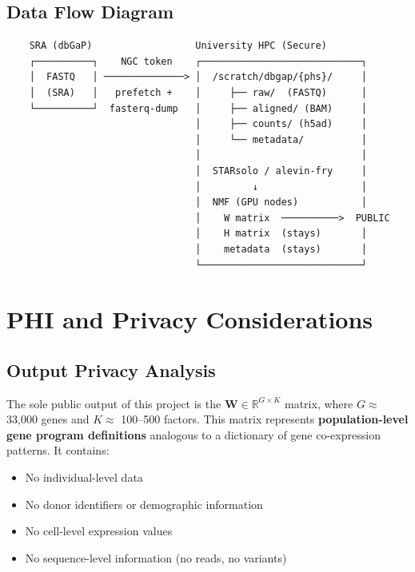 \documentclass[11pt,letterpaper]{article}
\begin{document}
\subsection{Data Flow Diagram}

\begin{verbatim}
    SRA (dbGaP)                  University HPC (Secure)
    ┌──────────┐    NGC token    ┌────────────────────────────┐
    │  FASTQ   │ ──────────────> │  /scratch/dbgap/{phs}/     │
    │  (SRA)   │   prefetch +    │     ├── raw/  (FASTQ)      │
    └──────────┘  fasterq-dump   │     ├── aligned/ (BAM)     │
                                 │     ├── counts/ (h5ad)     │
                                 │     └── metadata/          │
                                 │                            │
                                 │  STARsolo / alevin-fry     │
                                 │         ↓                  │
                                 │  NMF (GPU nodes)           │
                                 │    W matrix  ──────────>  PUBLIC
                                 │    H matrix  (stays)       │
                                 │    metadata  (stays)       │
                                 └────────────────────────────┘
\end{verbatim}

\section{PHI and Privacy Considerations}

\subsection{Output Privacy Analysis}

The sole public output of this project is the
$\mathbf{W} \in \mathbb{R}^{G \times K}$ matrix, where $G \approx$
33,000 genes and $K \approx$ 100--500 factors. This matrix represents
\textbf{population-level gene program definitions} analogous to a
dictionary of gene co-expression patterns. It contains:
\begin{itemize}[nosep]
    \item No individual-level data
    \item No donor identifiers or demographic information
    \item No cell-level expression values
    \item No sequence-level information (no reads, no variants)
\end{itemize}
\end{document}
